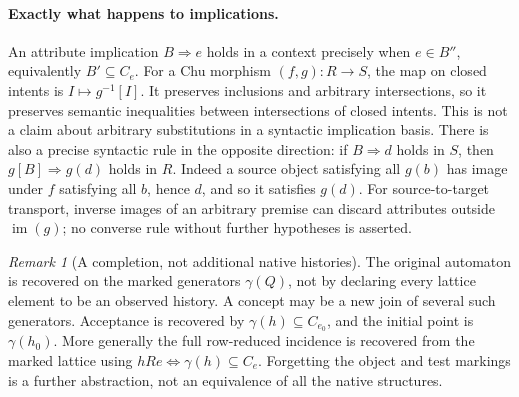 \documentclass[11pt]{article}
\theoremstyle{remark}
\newtheorem{remark}[theorem]{Remark}
\begin{document}
\paragraph{Exactly what happens to implications.}
An attribute implication $B\Rightarrow e$ holds in a context precisely
when $e\in B''$, equivalently $B'\subseteq C_e$. For a Chu morphism
$(f,g):R\to S$, the map on closed intents is $I\mapsto g^{-1}[I]$.
It preserves inclusions and arbitrary intersections, so it preserves
semantic inequalities between intersections of closed intents. This is
not a claim about arbitrary substitutions in a syntactic implication
basis. There is also a precise syntactic rule in the opposite direction:
if $B\Rightarrow d$ holds in $S$, then
$g[B]\Rightarrow g(d)$ holds in $R$. Indeed a source object satisfying
all $g(b)$ has image under $f$ satisfying all $b$, hence $d$, and so
it satisfies $g(d)$. For source-to-target transport, inverse images of
an arbitrary premise can discard attributes outside $\operatorname{im}(g)$;
no converse rule without further hypotheses is asserted.

\begin{remark}[A completion, not additional native histories]
The original automaton is recovered on the marked generators
$\gamma(Q)$, not by declaring every lattice element to be an observed
history. A concept may be a new join of several such generators.
Acceptance is recovered by
$\gamma(h)\subseteq C_{e_0}$, and the initial point is $\gamma(h_0)$.
More generally the full row-reduced incidence is recovered from the
marked lattice using
$hRe\Longleftrightarrow\gamma(h)\subseteq C_e$.
Forgetting the object and test markings is a further abstraction, not an
equivalence of all the native structures.
\end{remark}
\end{document}
